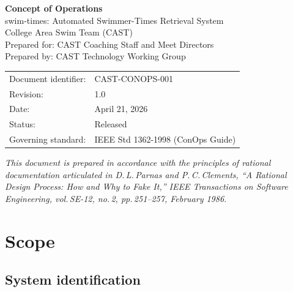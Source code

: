 \documentclass[12pt]{article}
\begin{document}
\begin{titlepage}
  \centering
  \vspace*{2cm}
  {\Huge\bfseries\color{castblue} Concept of Operations\\[0.5em]}
  {\Large swim-times: Automated Swimmer-Times Retrieval System}\\[2em]
  {\large College Area Swim Team (CAST)}\\[0.5em]
  {\normalsize Prepared for: CAST Coaching Staff and Meet Directors}\\[0.5em]
  {\normalsize Prepared by: CAST Technology Working Group}\\[2em]
  \begin{tabular}{ll}
    Document identifier: & CAST-CONOPS-001                  \\
    Revision:            & 1.0                               \\
    Date:                & April 21, 2026                    \\
    Status:              & Released                          \\
    Governing standard:  & IEEE Std 1362-1998 (ConOps Guide) \\
  \end{tabular}
  \vfill
  {\small\textit{This document is prepared in accordance with the principles of
  rational documentation articulated in D.\,L.\,Parnas and P.\,C.\,Clements,
  ``A Rational Design Process: How and Why to Fake It,''
  \textit{IEEE Transactions on Software Engineering}, vol.\,SE-12, no.\,2,
  pp.\,251--257, February 1986.}}
\end{titlepage}

\tableofcontents
\clearpage

\section{Scope}

\subsection{System identification}
\end{document}
